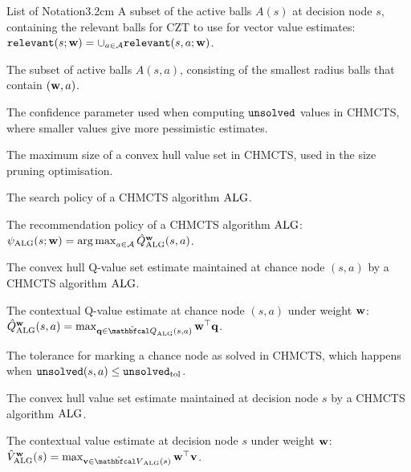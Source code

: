 \begin{mclistof}{List of Notation}{3.2cm}
        A subset of the active balls $A(s)$ at decision node $s$, containing the relevant balls for CZT to use for vector value estimates: ${\textnormal{\texttt{relevant}}}(s;\mathbf{w}) = \cup_{a\in\mathcal{A}} {\textnormal{\texttt{relevant}}}(s,a;\mathbf{w})$.
    \item[$\relevant(s,a;\bff{w})$]
        The subset of active balls $A(s,a)$, consisting of the smallest radius balls that contain $(\mathbf{w},a)$. %
    \\
    \item[$\deltaunsolved$]
        The confidence parameter used when computing ${\textnormal{\texttt{unsolved}}}$ values in CHMCTS, where smaller values give more pessimistic estimates.
    \item[$K_{\max}$]
        The maximum size of a convex hull value set in CHMCTS, used in the size pruning optimisation.
    \item[$\pialg(a|s;\bff{w})$]
        The search policy of a CHMCTS algorithm ${\textnormal{ALG}}$.
    \item[$\psialg(s;\bff{w})$]
        The recommendation policy of a CHMCTS algorithm ${\textnormal{ALG}}$: ${\psi_{{\textnormal{ALG}}}}(s;\mathbf{w})=\operatorname*{arg\,max}_{a\in\mathcal{A}}{\hat{Q}^{\mathbf{w}}_{{\textnormal{ALG}}}}(s,a)$.
    \item[$\Qalg(s,a)$]
        The convex hull Q-value set estimate maintained at chance node $(s,a)$ by a CHMCTS algorithm ${\textnormal{ALG}}$.
    \item[$\Qalgctx{\bff{w}}(s,a)$]
        The \textnormal{contextual Q-value estimate} at chance node $(s,a)$ under weight $\mathbf{w}$: $\Qalgctx{\bff{w}}(s,a)=\max_{\bff{q}\in\Qalg(s,a)}\bff{w}^\top\bff{q}$.
    \item[$\unsolvedtol$]
        The tolerance for marking a chance node as solved in CHMCTS, which happens when ${\textnormal{\texttt{unsolved}}}(s,a)\leq{\textnormal{\texttt{unsolved}}_{\textnormal{tol}}}$.
    \item[$\Valg(s)$]
        The convex hull value set estimate maintained at decision node $s$ by a CHMCTS algorithm ${\textnormal{ALG}}$.
    \item[$\Valgctx{\bff{w}}(s)$]
        The \textnormal{contextual value estimate} at decision node $s$ under weight $\mathbf{w}$: $\Valgctx{\bff{w}}(s)=\max_{\bff{v}\in\Valg(s)}\bff{w}^\top\bff{v}$. %
    \\

\end{mclistof}
